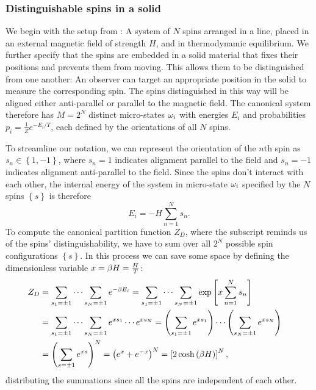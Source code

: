 \subsubsection{\label{sec:spin_chain}Distinguishable spins in a solid}
We begin with the setup from : A system of $N$ spins arranged in a line, placed in an external magnetic field of strength $H$, and in thermodynamic equilibrium.
We further specify that the spins are embedded in a solid material that fixes their positions and prevents them from moving.
This allows them to be distinguished from one another: An observer can target an appropriate position in the solid to measure the corresponding spin.
The spins distinguished in this way will be aligned either anti-parallel or parallel to the magnetic field.
The canonical system therefore has $M = 2^N$ distinct micro-states $\omega_i$ with energies $E_i$ and probabilities $p_i = \frac{1}{Z} e^{-E_i / T}$, each defined by the orientations of all $N$ spins.

To streamline our notation, we can represent the orientation of the $n$th spin as $s_n \in \left\{1, -1\right\}$, where $s_n = 1$ indicates alignment parallel to the field and $s_n = -1$ indicates alignment anti-parallel to the field.
Since the spins don't interact with each other, the internal energy of the system in micro-state $\omega_i$ specified by the $N$ spins $\left\{s\right\}$ is therefore
\begin{equation}
  \label{eq:spin_energy}
  E_i = -H \sum_{n = 1}^N s_n.
\end{equation}
To compute the canonical partition function $Z_D$, where the subscript reminds us of the spins' distinguishability, we have to sum over all $2^N$ possible spin configurations $\left\{s\right\}$.
In this process we can save some space by defining the dimensionless variable $x = \beta H = \frac{H}{T}$:
\begin{align}
  Z_D & = \sum_{s_1 = \pm 1} \cdots \sum_{s_N = \pm 1} e^{-\beta E_i} = \sum_{s_1 = \pm 1} \cdots \sum_{s_N = \pm 1} \exp\left[x \sum_{n = 1}^N s_n\right] \cr
      & = \sum_{s_1 = \pm 1} \cdots \sum_{s_N = \pm 1} e^{x s_1} \cdots e^{x s_N} = \left(\sum_{s_1 = \pm 1} e^{x s_1}\right) \cdots \left(\sum_{s_N = \pm 1} e^{x s_N}\right) \cr
      & = \left(\sum_{s = \pm 1} e^{x s}\right)^N = \left(e^x + e^{-x}\right)^N = \left[2\cosh\left(\beta H\right)\right]^N, \label{eq:spin_part_func}
\end{align}
distributing the summations since all the spins are independent of each other.

